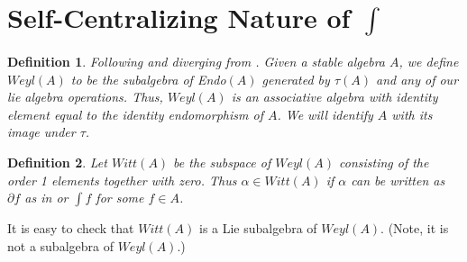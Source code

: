 \documentclass[10pt, oneside]{article}
\newtheorem{defn}{Definition}
\begin{document}
\section{Self-Centralizing Nature of $\int$}
\begin{defn}
Following \cite{pakianathan2010generalizedwittalgebrasvariable} and diverging from \cite{Dokovic1998}. Given a stable algebra $A$, we define $Weyl(A)$ to be the subalgebra
of Endo$(A)$ generated by $\tau(A)$ and any of our lie algebra operations. Thus,
$Weyl(A)$ is an associative algebra with identity element equal to 
the identity endomorphism of $A$. We will identify $A$ with its image under $\tau$.
\end{defn}
\begin{defn}
Let $Witt(A)$ be the subspace of $Weyl(A)$ consisting of the order 1 elements
together with zero. Thus $\alpha \in Witt(A)$ if $\alpha$ can be written
as $\partial f$ as in \cite{pakianathan2010generalizedwittalgebrasvariable} or $\int f$ for some $f \in A$. 
\end{defn}

It is easy to check that $Witt(A)$ is a Lie subalgebra of $Weyl(A)$. (Note,
it is not a subalgebra of $Weyl(A)$.)
\end{document}
